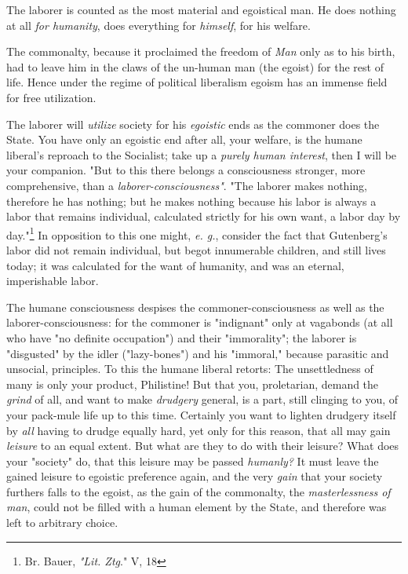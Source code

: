 The laborer is counted as the most material and egoistical man. He does 
nothing at all \textit{for humanity}, does everything for \textit{himself}, 
for his welfare.

The commonalty, because it proclaimed the freedom of \textit{Man} only as to 
his birth, had to leave him in the claws of the un-human man (the egoist) for 
the rest of life. Hence under the regime of political liberalism egoism has an 
immense field for free utilization.

The laborer will \textit{utilize} society for his \textit{egoistic} ends as 
the commoner does the State. You have only an egoistic end after all, your 
welfare, is the humane liberal's reproach to the Socialist; take up a 
\textit{purely human interest}, then I will be your companion. "{}But to this 
there belongs a consciousness stronger, more comprehensive, than a 
\textit{laborer-consciousness"{}}. "{}The laborer makes nothing, therefore he 
has nothing; but he makes nothing because his labor is always a labor that 
remains individual, calculated strictly for his own want, a labor day by 
day."{}\footnote{Br. Bauer, \textit{"{}Lit. Ztg}."{} V, 18} In opposition to 
this one might, \textit{e. g.}, consider the fact that Gutenberg's labor did 
not remain individual, but begot innumerable children, and still lives today; 
it was calculated for the want of humanity, and was an eternal, imperishable 
labor.

The humane consciousness despises the commoner-consciousness as well as the 
laborer-consciousness: for the commoner is "{}indignant"{} only at vagabonds 
(at all who have "{}no definite occupation"{}) and their "{}immorality"{}; the 
laborer is "{}disgusted"{} by the idler ("{}lazy-bones"{}) and his 
"{}immoral,"{} because parasitic and unsocial, principles. To this the humane 
liberal retorts: The unsettledness of many is only your product, Philistine! 
But that you, proletarian, demand the \textit{grind} of all, and want to make 
\textit{drudgery} general, is a part, still clinging to you, of your pack-mule 
life up to this time. Certainly you want to lighten drudgery itself by 
\textit{all} having to drudge equally hard, yet only for this reason, that all 
may gain \textit{leisure} to an equal extent. But what are they to do with 
their leisure? What does your "{}society"{} do, that this leisure may be 
passed \textit{humanly?} It must leave the gained leisure to egoistic 
preference again, and the very \textit{gain} that your society furthers falls 
to the egoist, as the gain of the commonalty, the \textit{masterlessness of 
man}, could not be filled with a human element by the State, and therefore was 
left to arbitrary choice.

